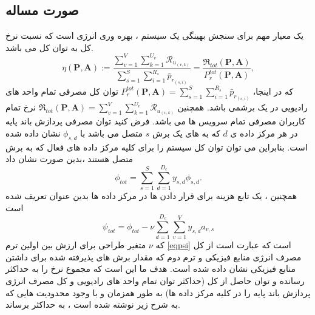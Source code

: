\subsection{صورت مساله}
یک معیار مهم برای سنجش بهینگی یک سیستم ، بهره وری انرژی است که نسبت نرخ کل به توان کل می باشد.
\begin{equation}
\textstyle \eta(\boldsymbol{P},\boldsymbol{A}) := \frac{\sum\limits_{v=1}^{V} \sum\limits_{k=1}^{{U}_v}\mathcal{R}_{u_{(v,k)}} }{\sum\limits_{s=1}^{S} \sum\limits_{i=1}^{{R}_s}\bar{p}_{r_{(s,i)}}} = \frac{\mathfrak{R}_{tot}(\boldsymbol{P},\boldsymbol{A})}{P_r^{{tot}}(\boldsymbol{P},\boldsymbol{A})},
\end{equation}
که در اینجا، 
 $P_r^{tot}(\boldsymbol{P},\boldsymbol{A}) = \sum\limits_{s=1}^{S}\sum\limits_{i=1}^{{R}_s}\bar{p}_{r_{(s,i)}}$
 توان کل مصرفی تمام واحد های رادیویی در یک برشمی باشد.
همچنین 
 $\mathfrak{R}_{tot}(\boldsymbol{P},\boldsymbol{A}) = \sum\limits_{v=1}^{V} \sum\limits_{k=1}^{{U}_v}\mathcal{R}_{u_{(v,k)}} $
 نرخ تمام کاربران مصرفی تمام سرویس ها می باشد.
فرض کنید توان مصرفی پردازش باند پایه در هر مرکز داده ی $d$ که به  های یک برش $s$ متصل می باشد با   
$\phi_{s,d}$
نشان داده شده است.
بنابراین می توان توان کل سیستم را برای کلیه مرکز داده های فعال که به برش متصل هستند ،بدین صورت نشان داد
\begin{equation*}
\textstyle \phi_{tot} = \sum_{s=1}^{S}\sum_{d=1}^{D_c}y_{s,d}\phi_{s,d}.
\end{equation*}
همچنین ، یک تابع هزینه برای قرار دادن  ها در مرکز داده ها بدین عنوان تعریف شده است
\begin{equation}\label{eqpsi}
\textstyle  \psi_{tot} = \phi_{tot} - \nu \sum_{d=1}^{D_c}\sum_{v=1}^{V}y_{s,d}a_{v,s}
\end{equation}
که $\nu$
متغیر طراحی برای ارزش بین اولین ترم 
\eqref{eqpsi}
 است که عبارت است از کل مصرف انرژی منابع فیزیکی و ترم دوم که مقدار برش های پذیرفته شده برای داشتن منابع فیزیکی نشان داده شده است.
هدف ما این است که مجموع نرخ را به حداکثر رسانده و توان حاصل از کل (حداکثر توان تمام واحد های رادیویی و کل مصرف انرژی پردازش باند پایه را در کلیه مرکز داده ها) به طور همزمان و با وجود محدودیت هایی که به شرح زیر نوشته شده است ، به حداکثر برساند.
